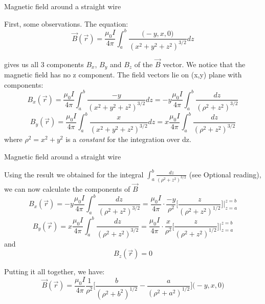 \begin{frame}{Magnetic field around a straight wire}

First, some observations. The equation:
\begin{equation*}
  \vec{B}(\vec{r}) =
     \frac{\mu_0I}{4\pi} \int_{a}^{b} \frac{\Big(-y, x, 0 \Big)}{(x^2+y^2+z^2)^{3/2}} dz
\end{equation*}

gives us all 3 components $B_{x}$, $B_{y}$ and $B_{z}$ of the $\vec{B}$ vector.
We notice that the magnetic field has no z component.
The field vectors lie on (x,y) plane with components:
\begin{equation*}
  B_{x}(\vec{r}) =
     \frac{\mu_0I}{4\pi} \int_{a}^{b} \frac{-y}{(x^2+y^2+z^2)^{3/2}} dz =
     -y \frac{\mu_0I}{4\pi} \int_{a}^{b} \frac{dz}{({\rho}^2+z^2)^{3/2}}
\end{equation*}
\begin{equation*}
  B_{y}(\vec{r}) =
     \frac{\mu_0I}{4\pi} \int_{a}^{b} \frac{x}{(x^2+y^2+z^2)^{3/2}} dz =
     x \frac{\mu_0I}{4\pi} \int_{a}^{b} \frac{dz}{({\rho}^2+z^2)^{3/2}}
\end{equation*}
where ${\rho}^2 = x^2+y^2$ is a {\em constant} for the integration over dz.

\end{frame}


%
%
%

\begin{frame}{Magnetic field around a straight wire}

Using the result we obtained for the integral $\int_{a}^{b}
\frac{dz}{({\rho}^2+z^2)^{3/2}}$ (see Optional reading),
we can now calculate the components of $\vec{B}$
\begin{equation*}
  B_{x}(\vec{r}) =
     -y \frac{\mu_0I}{4\pi} \int_{a}^{b} \frac{dz}{({\rho}^2+z^2)^{3/2}} =
     \frac{\mu_0I}{4\pi} \cdot \frac{-y}{{\rho}^{2}} \Big[ \frac{z}{({\rho}^{2}+z^{2})^{1/2}} \Big] \biggr\rvert_{z=a}^{z=b}
\end{equation*}
\begin{equation*}
  B_{y}(\vec{r}) =
     x \frac{\mu_0I}{4\pi} \int_{a}^{b} \frac{dz}{({\rho}^2+z^2)^{3/2}} =
     \frac{\mu_0I}{4\pi} \cdot \frac{x}{{\rho}^{2}} \Big[ \frac{z}{({\rho}^{2}+z^{2})^{1/2}} \Big] \biggr\rvert_{z=a}^{z=b}
\end{equation*}
and
\begin{equation*}
  B_{z}(\vec{r}) = 0
\end{equation*}

Putting it all together, we have:
\begin{equation*}
  \vec{B}(\vec{r}) = \frac{\mu_0I}{4\pi} \frac{1}{{\rho}^{2}}
    \Big[ \frac{b}{({\rho}^{2}+b^{2})^{1/2}} - \frac{a}{({\rho}^{2}+a^{2})^{1/2}}\Big] \Big( -y, x, 0 \Big)
\end{equation*}

\end{frame}

